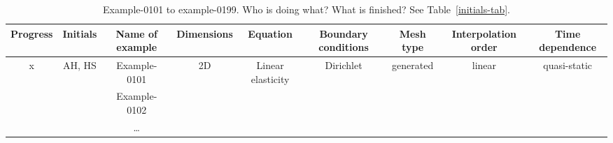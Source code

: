 %
\clearpage
%
\begin{sidewaystable}[h!]
    \centering
    \begin{tabular}{ c | c | c | c | c | c | c | c | c }
        Progress & Initials & Name of example & Dimensions & Equation & Boundary conditions & Mesh type & Interpolation order & Time dependence \\
        \midrule
        x        & AH, HS   & Example-0101 & 2D & Linear elasticity & Dirichlet & generated & linear & quasi-static \\
                 &          & Example-0102 &    &                   &           &           &        &              \\
                 &          & \ldots \\
    \end{tabular}
    \caption{Example-0101 to example-0199. Who is doing what? What is finished? See Table~\ref{initials-tab}.}
    \label{progress-x1xx-tab}
\end{sidewaystable}
%
